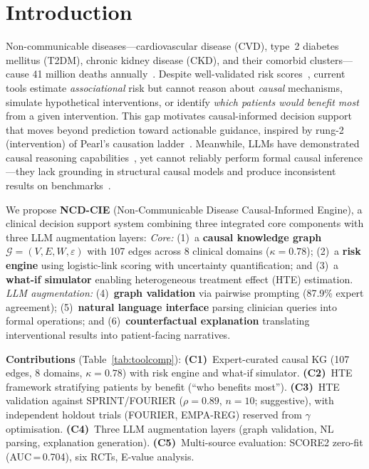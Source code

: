 \documentclass[runningheads]{llncs}
\begin{document}
\section{Introduction}\label{sec:intro}

Non-communicable diseases---cardiovascular disease (CVD), type~2
diabetes mellitus (T2DM), chronic kidney disease (CKD), and their
comorbid clusters---cause 41 million deaths
annually~\cite{who2021ncd}.
Despite well-validated risk scores~\cite{dagostino2008,hippisley2017qrisk3,score22021},
current tools estimate \emph{associational} risk but cannot reason about
\emph{causal} mechanisms, simulate hypothetical interventions, or
identify \emph{which patients would benefit most} from a given
intervention.
This gap motivates causal-informed decision support that moves beyond
prediction toward actionable guidance, inspired by rung-2 (intervention)
of Pearl's causation ladder~\cite{pearl2018book}.
Meanwhile, LLMs have demonstrated causal reasoning
capabilities~\cite{ma2024causal,kiciman2023causal}, yet cannot
reliably perform formal causal inference---they lack grounding
in structural causal models and produce inconsistent results on
benchmarks~\cite{jin2023cladder}.

We propose \textbf{NCD-CIE} (Non-Communicable Disease Causal-Informed
Engine), a clinical decision support system combining three integrated
core components with three LLM augmentation layers:
\emph{Core:}
(1)~a \textbf{causal knowledge graph} $\mathcal{G}=(V,E,W,\varepsilon)$
  with 107 edges across 8 clinical domains ($\kappa=0.78$);
(2)~a \textbf{risk engine} using logistic-link scoring with
  uncertainty quantification; and
(3)~a \textbf{what-if simulator} enabling heterogeneous treatment
  effect (HTE) estimation.
\emph{LLM augmentation:}
(4)~\textbf{graph validation} via pairwise prompting (87.9\% expert
  agreement);
(5)~\textbf{natural language interface} parsing clinician queries
  into formal operations; and
(6)~\textbf{counterfactual explanation} translating interventional
  results into patient-facing narratives.

\noindent\textbf{Contributions}
(Table~\ref{tab:toolcomp}):
\textbf{(C1)}~Expert-curated causal KG (107 edges, 8 domains,
$\kappa=0.78$) with risk engine and what-if simulator.
\textbf{(C2)}~HTE framework stratifying patients by benefit
(``who benefits most'').
\textbf{(C3)}~HTE validation against SPRINT/FOURIER ($\rho = 0.89$,
$n = 10$; suggestive), with independent holdout trials
(FOURIER, EMPA-REG) reserved from $\gamma$ optimisation.
\textbf{(C4)}~Three LLM augmentation layers (graph validation,
NL parsing, explanation generation).
\textbf{(C5)}~Multi-source evaluation: SCORE2 zero-fit
(AUC\,=\,0.704), six RCTs, E-value analysis.
\end{document}
